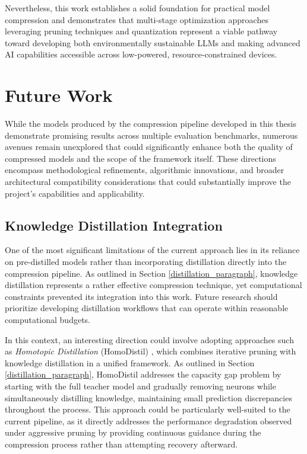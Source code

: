 Nevertheless, this work establishes a solid foundation for practical model compression and demonstrates that multi-stage optimization approaches leveraging pruning techniques and quantization represent a viable pathway toward developing both environmentally sustainable LLMs and making advanced AI capabilities accessible across low-powered, resource-constrained devices.

\section{Future Work}

While the models produced by the compression pipeline developed in this thesis demonstrate promising results across multiple evaluation benchmarks, numerous avenues remain unexplored that could significantly enhance both the quality of compressed models and the scope of the framework itself. These directions encompass methodological refinements, algorithmic innovations, and broader architectural compatibility considerations that could substantially improve the project's capabilities and applicability.

\subsection{Knowledge Distillation Integration}

One of the most significant limitations of the current approach lies in its reliance on pre-distilled models rather than incorporating distillation directly into the compression pipeline. As outlined in Section \ref{distillation_paragraph}, knowledge distillation represents a rather effective compression technique, yet computational constraints prevented its integration into this work. Future research should prioritize developing distillation workflows that can operate within reasonable computational budgets.

In this context, an interesting direction could involve adopting approaches such as \textit{Homotopic Distillation} (HomoDistil) \cite{homodistil}, which combines iterative pruning with knowledge distillation in a unified framework. As outlined in Section \ref{distillation_paragraph}, HomoDistil addresses the capacity gap problem by starting with the full teacher model and gradually removing neurons while simultaneously distilling knowledge, maintaining small prediction discrepancies throughout the process. This approach could be particularly well-suited to the current pipeline, as it directly addresses the performance degradation observed under aggressive pruning by providing continuous guidance during the compression process rather than attempting recovery afterward.

